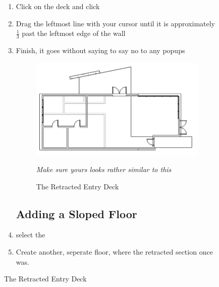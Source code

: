 \documentclass{tufte-book} %
\begin{document}
\begin{figure}
\begin{enumerate}

	\subsection{Shortening the Deck}
		\item Click on the deck and click 
		\item Drag the leftmost line with your cursor until it is approximately \( \frac{1}{3} \) past the leftmost edge of the wall
		\item Finish, it goes without saying to say no to any popups
		
		\begin{figure}
			\includegraphics[width=\linewidth]{revitentrydeckretracted.png}
			\caption{The Retracted Entry Deck}
			\emph{Make sure yours looks rather similar to this}
			\label{fig:reventrydeckretract}
		\end{figure}
	

	\subsection{Adding a Sloped Floor}
		\item select the 
		\item Create another, seperate floor, where the retracted section once was.
		

\end{enumerate}
\end{figure}
\end{document}
